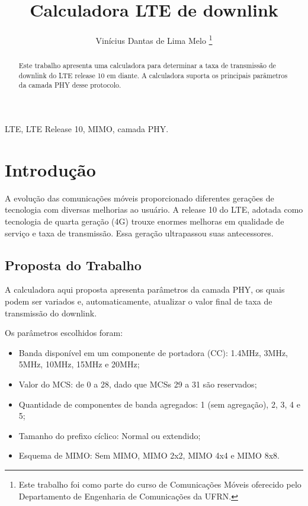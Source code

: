 \documentclass[journal,11pt,twocolumn]{IEEEtran}
\begin{document}
\title{Calculadora LTE de downlink}


\author{Vinícius Dantas de Lima Melo
    \thanks{Este trabalho foi como parte do curso de Comunicações Móveis oferecido pelo Departamento de Engenharia de Comunicações da UFRN.}
}


\maketitle

\begin{abstract}

Este trabalho apresenta uma calculadora para determinar a taxa de transmissão de downlink do LTE release 10 em diante. A calculadora suporta os principais parâmetros da camada PHY desse protocolo.

\end{abstract}

\begin{keywords}
LTE, LTE Release 10, MIMO, camada PHY.
\end{keywords}


\section{Introdução}

A evolução das comunicações móveis proporcionado diferentes gerações de tecnologia com diversas melhorias ao usuário. A release 10 do LTE, adotada como tecnologia de quarta geração (4G) trouxe enormes melhoras em qualidade de serviço e taxa de transmissão. Essa geração ultrapassou suas antecessores.

\subsection{Proposta do Trabalho}

A calculadora aqui proposta apresenta parâmetros da camada PHY, os quais podem ser variados e, automaticamente, atualizar o valor final de taxa de transmissão do downlink.

Os parâmetros escolhidos foram:
\begin{itemize}
    \item Banda disponível em um componente de portadora (CC): 1.4MHz, 3MHz, 5MHz, 10MHz, 15MHz e 20MHz;
    \item Valor do MCS: de 0 a 28, dado que MCSs 29 a 31 são reservados;
    \item Quantidade de componentes de banda agregados: 1 (sem agregação), 2, 3, 4 e 5;
    \item Tamanho do prefixo cíclico: Normal ou extendido;
    \item Esquema de MIMO: Sem MIMO, MIMO 2x2, MIMO 4x4 e MIMO 8x8.
\end{itemize}
\end{document}
